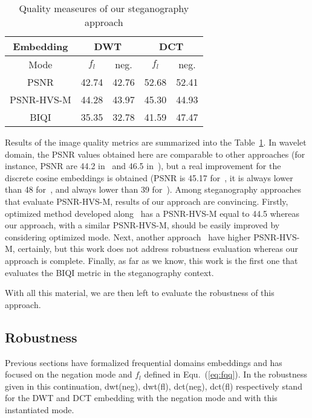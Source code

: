 \documentclass{comjnl}
\begin{document}
\begin{table}
\begin{center}
\begin{tabular}{|c|c|c|c|c|}
\hline
Embedding & \multicolumn{2}{|c|}{DWT} 
 & \multicolumn{2}{|c|}{DCT} \\
\hline
Mode & $f_l$ & neg. & $f_l$ & neg. \\
\hline
PSNR & 42.74     & 42.76     &  52.68      &  52.41   \\
\hline
PSNR-HVS-M & 44.28  & 43.97 & 45.30 & 44.93 \\
\hline
BIQI & 35.35 & 32.78 & 41.59 & 47.47 \\
\hline
\end{tabular}
\end{center}
\caption{Quality measeures of our steganography approach\label{table:quality}} 
\end{table}



Results of the image quality metrics 
are summarized into the Table~\ref{table:quality}.
In wavelet domain, the PSNR values obtained here are comparable to other approaches
(for instance, PSNR are 44.2 in~\cite{TCL05} and 46.5 in~\cite{DA10}), 
but  a real improvement for the discrete cosine embeddings is obtained 
(PSNR is 45.17 for~\cite{CFS08}, it is always lower than 48 for~\cite{Mohanty:2008:IWB:1413862.1413865}, and always lower than 39 for~\cite{MK08}).
Among steganography approaches that evaluate PSNR-HVS-M, results of our approach 
are convincing. Firstly, optimized method developed along~\cite{Randall11} has a PSNR-HVS-M equal to 44.5 whereas our approach, with a similar PSNR-HVS-M, should be easily improved by considering optimized mode. Next, 
another approach~\cite{Muzzarelli:2010} have higher PSNR-HVS-M, certainly, but
this work does not address robustness evaluation whereas our approach is complete.
Finally, as far as we know, this work is the first one that evaluates the BIQI metric in the steganography context. 

 

With all this material, we are then left to evaluate the robustness of this 
approach. 







\subsection{Robustness}
Previous sections have formalized frequential domains embeddings and
has focused on the negation mode and $f_l$ defined in Equ.~(\ref{eq:fqq}).
In the robustness given in this continuation, {dwt}(neg), 
{dwt}(fl), {dct}(neg), {dct}(fl) 
respectively stand for the DWT and DCT embedding 
with the negation mode and with this instantiated mode.
 
\end{document}
